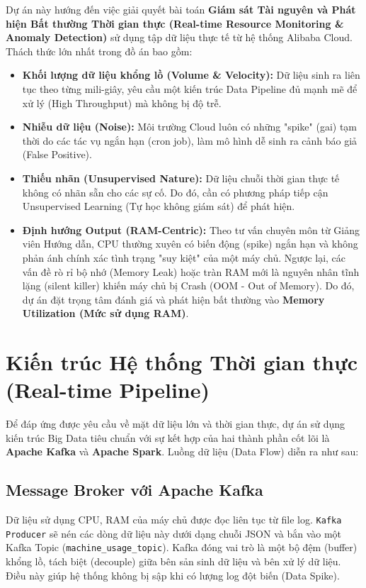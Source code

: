 \documentclass[12pt,a4paper]{article}
\begin{document}
Dự án này hướng đến việc giải quyết bài toán \textbf{Giám sát Tài nguyên và Phát hiện Bất thường Thời gian thực (Real-time Resource Monitoring \& Anomaly Detection)} sử dụng tập dữ liệu thực tế từ hệ thống Alibaba Cloud. Thách thức lớn nhất trong đồ án bao gồm:
\begin{itemize}
    \item \textbf{Khối lượng dữ liệu khổng lồ (Volume \& Velocity):} Dữ liệu sinh ra liên tục theo từng mili-giây, yêu cầu một kiến trúc Data Pipeline đủ mạnh mẽ để xử lý (High Throughput) mà không bị độ trễ.
    \item \textbf{Nhiễu dữ liệu (Noise):} Môi trường Cloud luôn có những "spike" (gai) tạm thời do các tác vụ ngắn hạn (cron job), làm mô hình dễ sinh ra cảnh báo giả (False Positive).
    \item \textbf{Thiếu nhãn (Unsupervised Nature):} Dữ liệu chuỗi thời gian thực tế không có nhãn sẵn cho các sự cố. Do đó, cần có phương pháp tiếp cận Unsupervised Learning (Tự học không giám sát) để phát hiện.
    \item \textbf{Định hướng Output (RAM-Centric):} Theo tư vấn chuyên môn từ Giảng viên Hướng dẫn, CPU thường xuyên có biến động (spike) ngắn hạn và không phản ánh chính xác tình trạng "suy kiệt" của một máy chủ. Ngược lại, các vấn đề rò rỉ bộ nhớ (Memory Leak) hoặc tràn RAM mới là nguyên nhân tĩnh lặng (silent killer) khiến máy chủ bị Crash (OOM - Out of Memory). Do đó, dự án đặt trọng tâm đánh giá và phát hiện bất thường vào \textbf{Memory Utilization (Mức sử dụng RAM)}.
\end{itemize}

\section{Kiến trúc Hệ thống Thời gian thực (Real-time Pipeline)}

Để đáp ứng được yêu cầu về mặt dữ liệu lớn và thời gian thực, dự án sử dụng kiến trúc Big Data tiêu chuẩn với sự kết hợp của hai thành phần cốt lõi là \textbf{Apache Kafka} và \textbf{Apache Spark}. Luồng dữ liệu (Data Flow) diễn ra như sau:

\subsection{Message Broker với Apache Kafka}
Dữ liệu sử dụng CPU, RAM của máy chủ được đọc liên tục từ file log. \texttt{Kafka Producer} sẽ nén các dòng dữ liệu này dưới dạng chuỗi JSON và bắn vào một Kafka Topic (\texttt{machine\_usage\_topic}). 
Kafka đóng vai trò là một bộ đệm (buffer) khổng lồ, tách biệt (decouple) giữa bên sản sinh dữ liệu và bên xử lý dữ liệu. Điều này giúp hệ thống không bị sập khi có lượng log đột biến (Data Spike).
\end{document}
